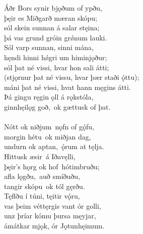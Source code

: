 \bva Áðr Bors synir \hld bjǫðum of ypðu, \\%
þęir es Miðgarð \hld mæran skópu; \\%
sól skein sunnan \hld á salar stęina; \\%
þá vas grund gróin \hld grǿnum lauki.\\%

\bva Sól varp sunnan, \hld sinni mána,\footnotemark[10] \\%
hęndi hinni hǿgri \hld um himinjǫður; \\%
sól þat né vissi, \hld hvar hon sali átti; \\%
(stjǫrnur þat né vissu, \hld hvar þær staði ǫ́ttu); \\%
máni þat né vissi, \hld hvat hann męgins átti.
\\%

\bva Þá gingu ręgin ǫll \hld á rǫkstóla, \\%
ginnhęilǫg goð, \hld ok gættusk of þat.\footnotemark[20] \\%
\\%

\bva Nótt ok niðjum \hld nǫfn of gǫ́fu, \\%
morgin hétu \hld ok miðjan dag, \\%
undurn ok aptan, \hld ǫ́rum at tęlja.\footnotemark[22]
\\%

\bva Hittusk æsir \hld á Iðavęlli, \\%
þęir's hǫrg ok hof \hld hótimbruðu; \\%
afla lǫgðu, \hld auð smíðuðu, \\%
tangir skópu \hld ok tól gęrðu.\\%

\bva Tęflðu í túni, \hld tęitir vǫ́ru, \\%
vas þeim véttęrgis \hld vant ór golli, \\%
unz þríar kómu \hld þursa męyjar, \\%
ámátkar mjǫk, \hld ór Jǫtunhęimum.\footnotemark[21]
\\%

